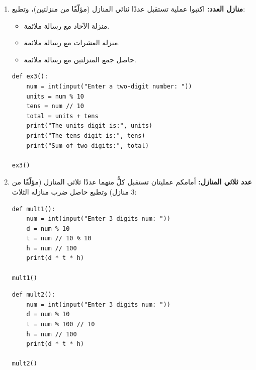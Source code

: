 \documentclass[14pt]{extarticle}
\begin{document}
\begin{enumerate}[label=\textbf{تمرين \arabic*:}, wide=0pt, itemsep=2.2em]
\item \textbf{منازل العدد:} اكتبوا عملية تستقبل عددًا ثنائي المنازل (مؤلّفًا من منزلتين)، وتطبع:
\begin{itemize}
\item منزلة الآحاد مع رسالة ملائمة.
\item منزلة العشرات مع رسالة ملائمة.
\item حاصل جمع المنزلتين مع رسالة ملائمة.
\end{itemize}

\ifwithsols
\begin{boxSolution}
\begin{english}
\begin{verbatim}
def ex3():
    num = int(input("Enter a two-digit number: "))
    units = num % 10
    tens = num // 10
    total = units + tens
    print("The units digit is:", units)
    print("The tens digit is:", tens)
    print("Sum of two digits:", total)

ex3()
\end{verbatim}
\end{english}
\end{boxSolution}
\fi
\filbreak

\item \textbf{عدد ثلاثي المنازل:} أمامكم عمليتان تستقبل كلٌّ منهما عددًا ثلاثي المنازل (مؤلّفًا من $3$ منازل) وتطبع حاصل ضرب منازله الثلاث:

\begin{boxCode}
\begin{english}
\begin{verbatim}
def mult1():
    num = int(input("Enter 3 digits num: "))
    d = num % 10
    t = num // 10 % 10
    h = num // 100
    print(d * t * h)

mult1()
\end{verbatim}
\end{english}
\end{boxCode}

\begin{boxCode}
\begin{english}
\begin{verbatim}
def mult2():
    num = int(input("Enter 3 digits num: "))
    d = num % 10
    t = num % 100 // 10
    h = num // 100
    print(d * t * h)

mult2()
\end{verbatim}
\end{english}
\end{boxCode}


\end{enumerate}
\end{document}
